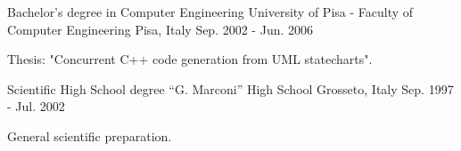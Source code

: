 \begin{cventries}
  \cventry
    {Bachelor's degree in Computer Engineering} %
    {University of Pisa - Faculty of Computer Engineering} %
    {Pisa, Italy} %
    {Sep. 2002 - Jun. 2006} %
    {
      \begin{cvitems} %
	\item {Thesis: "Concurrent C++ code generation from UML statecharts".}
      \end{cvitems}
    }

  \cventry
    {Scientific High School degree} %
    {``G. Marconi'' High School} %
    {Grosseto, Italy} %
    {Sep. 1997 - Jul. 2002} %
    {
      \begin{cvitems} %
	\item {General scientific preparation.}
      \end{cvitems}
    }

\end{cventries}
